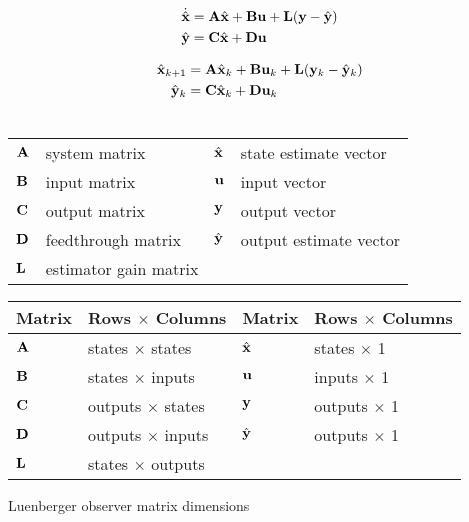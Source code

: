 \begin{theorem}
  \begin{align}
    \dot{\hat{\mathbf{x}}} &= \mathbf{A}\hat{\mathbf{x}} + \mathbf{B}\mathbf{u} +
      \mathbf{L} (\mathbf{y} - \hat{\mathbf{y}}) \label{eq:s_obsv_x} \\
    \hat{\mathbf{y}} &= \mathbf{C}\hat{\mathbf{x}} + \mathbf{D}\mathbf{u} \label{eq:s_obsv_y}
  \end{align}

  \begin{align}
    \hat{\mathbf{x}}_{k+1} &= \mathbf{A}\hat{\mathbf{x}}_k + \mathbf{B}\mathbf{u}_k +
      \mathbf{L}(\mathbf{y}_k - \hat{\mathbf{y}}_k) \label{eq:z_obsv_x} \\
    \hat{\mathbf{y}}_k &= \mathbf{C}\hat{\mathbf{x}}_k + \mathbf{D}\mathbf{u}_k
      \label{eq:z_obsv_y} \\ \nonumber
  \end{align}

  \begin{figurekey}
    \begin{tabulary}{\linewidth}{LLLL}
      $\mathbf{A}$ & system matrix      & $\hat{\mathbf{x}}$ & state estimate vector \\
      $\mathbf{B}$ & input matrix       & $\mathbf{u}$ & input vector \\
      $\mathbf{C}$ & output matrix      & $\mathbf{y}$ & output vector \\
      $\mathbf{D}$ & feedthrough matrix & $\hat{\mathbf{y}}$ & output estimate vector \\
      $\mathbf{L}$ & estimator gain matrix & & \\
    \end{tabulary}
  \end{figurekey}
\end{theorem}

\begin{booktable}
  \begin{tabular}{|ll|ll|}
    \hline
    \rowcolor{headingbg}
    \textbf{Matrix} & \textbf{Rows $\times$ Columns} &
    \textbf{Matrix} & \textbf{Rows $\times$ Columns} \\
    \hline
    $\mathbf{A}$ & states $\times$ states & $\hat{\mathbf{x}}$ & states $\times$ 1 \\
    $\mathbf{B}$ & states $\times$ inputs & $\mathbf{u}$ & inputs $\times$ 1 \\
    $\mathbf{C}$ & outputs $\times$ states & $\mathbf{y}$ & outputs $\times$ 1 \\
    $\mathbf{D}$ & outputs $\times$ inputs & $\hat{\mathbf{y}}$ & outputs $\times$ 1 \\
    $\mathbf{L}$ & states $\times$ outputs & & \\
    \hline
  \end{tabular}
  \caption{Luenberger observer matrix dimensions}
  \label{tab:luenberger_matrix_dims}
\end{booktable}

